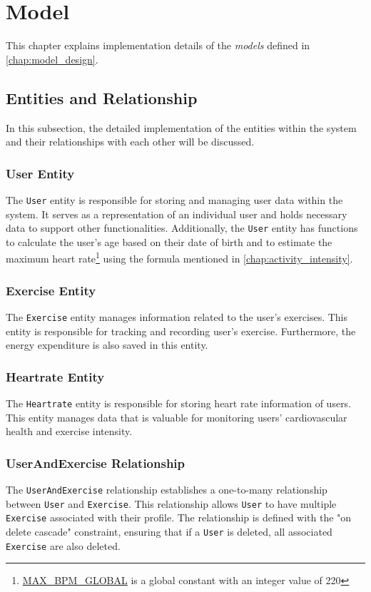 \section{Model}
\label{chap:model_impl}
This chapter explains implementation details of the \emph{models} defined in \autoref{chap:model_design}.

\subsection{Entities and Relationship}
\label{chap:objectmodel_impl}
In this subsection, the detailed implementation of the entities within the system and their relationships with each other will be discussed.

\subsubsection{User Entity}
The \verb;User; entity is responsible for storing and managing user data within the system.
It serves as a representation of an individual user and holds necessary data to support other functionalities.
Additionally, the \verb;User; entity has functions to calculate the user's age based on their date of birth and to estimate the maximum heart rate\footnote{\url{MAX_BPM_GLOBAL} is a global constant with an integer value of 220} using the formula mentioned in \autoref{chap:activity_intensity}.


\subsubsection{Exercise Entity}
The \verb;Exercise; entity manages information related to the user's exercises. 
This entity is responsible for tracking and recording user's exercise. Furthermore, the energy expenditure is also saved in this entity.


\subsubsection{Heartrate Entity}
The \verb;Heartrate; entity is responsible for storing heart rate information of users. 
This entity manages data that is valuable for monitoring users' cardiovascular health and exercise intensity.


\subsubsection{UserAndExercise Relationship}
The \verb;UserAndExercise; relationship establishes a one-to-many relationship between \verb;User; and \verb;Exercise;. 
This relationship allows \verb;User; to have multiple \verb;Exercise; associated with their profile. 
The relationship is defined with the "on delete cascade" constraint, ensuring that if a \verb;User; is deleted, all associated \verb;Exercise; are also deleted.

